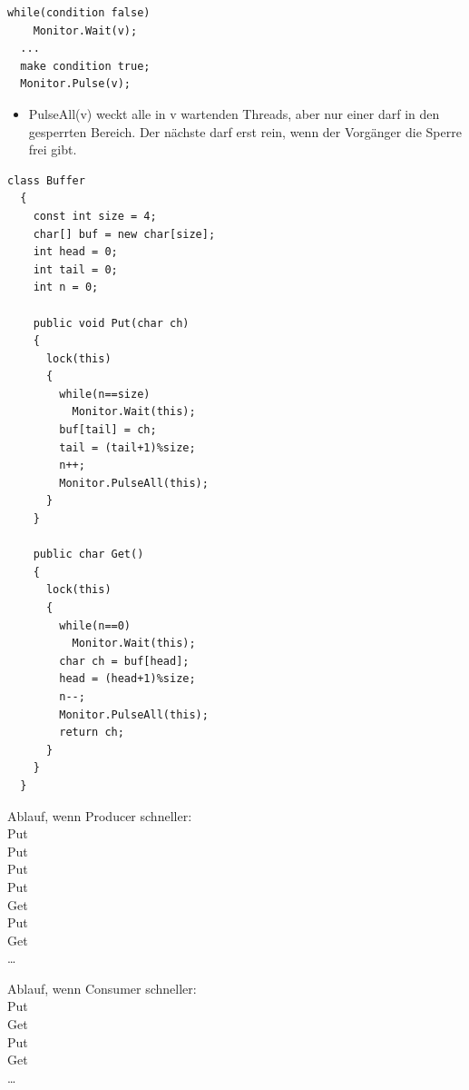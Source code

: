 \begin{lstlisting}[style=C]
  while(condition false)
    Monitor.Wait(v); 
  ...
  make condition true;
  Monitor.Pulse(v);       
\end{lstlisting}
\begin{itemize}
  \item PulseAll(v) weckt alle in v wartenden Threads, aber nur einer darf in
  den gesperrten Bereich. Der nächste darf erst rein, wenn der Vorgänger die
  Sperre frei gibt.
\end{itemize}
\begin{lstlisting}[style=C]
  class Buffer
  {
    const int size = 4; 
    char[] buf = new char[size];
    int head = 0; 
    int tail = 0; 
    int n = 0; 
    
    public void Put(char ch)
    {
      lock(this)
      {
        while(n==size)
          Monitor.Wait(this); 
        buf[tail] = ch; 
        tail = (tail+1)%size; 
        n++; 
        Monitor.PulseAll(this); 
      }
    }
    
    public char Get()
    {
      lock(this)
      {
        while(n==0)
          Monitor.Wait(this); 
        char ch = buf[head]; 
        head = (head+1)%size; 
        n--; 
        Monitor.PulseAll(this); 
        return ch; 
      }    
    }
  }      
\end{lstlisting}
Ablauf, wenn Producer schneller:\\
Put\\
Put\\
Put\\
Put\\
Get\\
Put\\
Get\\
\ldots

Ablauf, wenn Consumer schneller:\\
Put\\
Get\\ 
Put\\
Get\\
\ldots